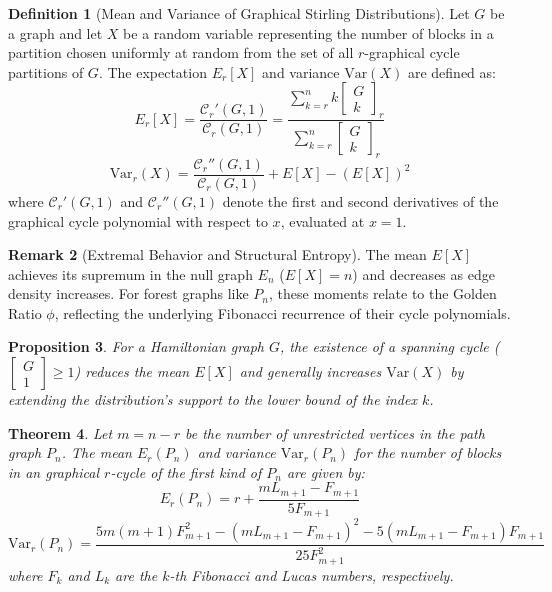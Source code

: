 \documentclass{amsart}
\newtheorem{theorem}{Theorem}[section]
\newtheorem{proposition}[theorem]{Proposition}
\theoremstyle{definition}
\newtheorem{definition}[theorem]{Definition}
\newtheorem{remark}[theorem]{Remark}
\def\st#1#2{\begin{bmatrix} #1 \\ #2 \end{bmatrix}}
\begin{document}
\begin{definition}[Mean and Variance of Graphical Stirling Distributions]
Let $G$ be a graph and let $X$ be a random variable representing the number of blocks in a partition chosen uniformly at random from the set of all $r$-graphical cycle partitions of $G$. The expectation $E_r[X]$ and variance $\text{Var}(X)$ are defined as:
\begin{equation}
    E_r[X] = \frac{\mathcal{C}_r'(G, 1)}{\mathcal{C}_r(G, 1)} = \frac{\sum_{k=r}^n k \st{G}{k}_r}{\sum_{k=r}^n \st{G}{k}_r}
\end{equation}
\begin{equation}
    \text{Var}_r(X) = \frac{\mathcal{C}_r''(G, 1)}{\mathcal{C}_r(G, 1)} + E[X] - (E[X])^2
\end{equation}
where $\mathcal{C}_r'(G, 1)$ and $\mathcal{C}_r''(G, 1)$ denote the first and second derivatives of the graphical cycle polynomial with respect to $x$, evaluated at $x=1$.
\end{definition}
\begin{remark}[Extremal Behavior and Structural Entropy]
The mean $E[X]$ achieves its supremum in the null graph $E_n$ ($E[X]=n$) and decreases as edge density increases. For forest graphs like $P_n$, these moments relate to the Golden Ratio $\phi$, reflecting the underlying Fibonacci recurrence of their cycle polynomials.
\end{remark}

\begin{proposition}
For a Hamiltonian graph $G$, the existence of a spanning cycle ($\st{G}{1} \geq 1$) reduces the mean $E[X]$ and generally increases $\text{Var}(X)$ by extending the distribution's support to the lower bound of the index $k$.
\end{proposition}

\begin{theorem}
Let $m = n-r$ be the number of unrestricted vertices in the path graph $P_n$. The  mean $E_r(P_n)$ and variance $\text{Var}_r(P_n)$ for the number of blocks in an graphical $r$-cycle of the first kind of $P_n$ are given by:
\begin{equation*}
    E_r(P_n) = r + \frac{m L_{m+1} - F_{m+1}}{5 F_{m+1}}
\end{equation*}
\begin{equation*}
    \text{Var}_r(P_n) = \frac{5m(m+1)F_{m+1}^2 - (m L_{m+1} - F_{m+1})^2 - 5(m L_{m+1} - F_{m+1})F_{m+1}}{25 F_{m+1}^2}
\end{equation*}
where $F_k$ and $L_k$ are the $k$-th Fibonacci and Lucas numbers, respectively.
\end{theorem}
\end{document}

